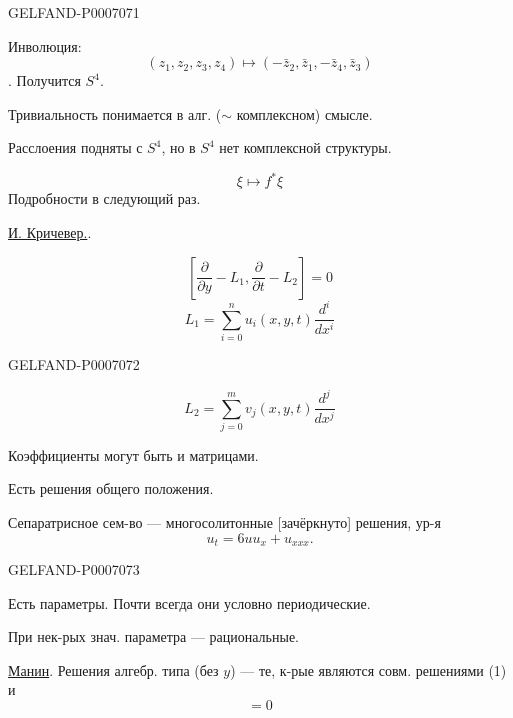 \begin{GelfandAdjacentEvidence}{GELFAND-P000707}{1}

Инволюция:
\[
(z_1,z_2,z_3,z_4)\mapsto(-\bar z_2,\bar z_1,-\bar z_4,\bar z_3)
\]
.
Получится \(S^4\).

Тривиальность понимается в алг. (\(\sim\) комплексном) смысле.

Расслоения подняты с \(S^4\), но в \(S^4\) нет комплексной структуры.

\[
\xi\mapsto f^*\xi
\]
Подробности в следующий раз.

\underline{И. Кричевер.}\qquad {}.

\begin{equation}
\left[\frac{\partial}{\partial y}-L_1,\frac{\partial}{\partial t}-L_2\right]=0
\tag{1}
\end{equation}
\begin{equation}
L_1=\sum_{i=0}^n u_i(x,y,t)\frac{d^i}{dx^i}
\tag{2}
\end{equation}
\end{GelfandAdjacentEvidence}
\begin{GelfandAdjacentEvidence}{GELFAND-P000707}{2}

\begin{equation}
L_2=\sum_{j=0}^m v_j(x,y,t)\frac{d^j}{dx^j}
\tag{3}
\end{equation}

Коэффициенты могут быть и матрицами.

Есть решения общего положения.

Сепаратрисное сем-во --- многосолитонные [зачёркнуто] решения, ур-я
\[
u_t=6uu_x+u_{xxx}.
\]
\end{GelfandAdjacentEvidence}
\begin{GelfandAdjacentEvidence}{GELFAND-P000707}{3}


Есть параметры. Почти всегда они условно периодические.

При нек-рых знач. параметра --- рациональные.

\underline{Манин}. Решения алгебр. типа (без \(y\)) --- те, к-рые являются совм. решениями (1) и
\begin{equation}
[L_1,L_3]=0
\tag{4}
\end{equation}
\end{GelfandAdjacentEvidence}
